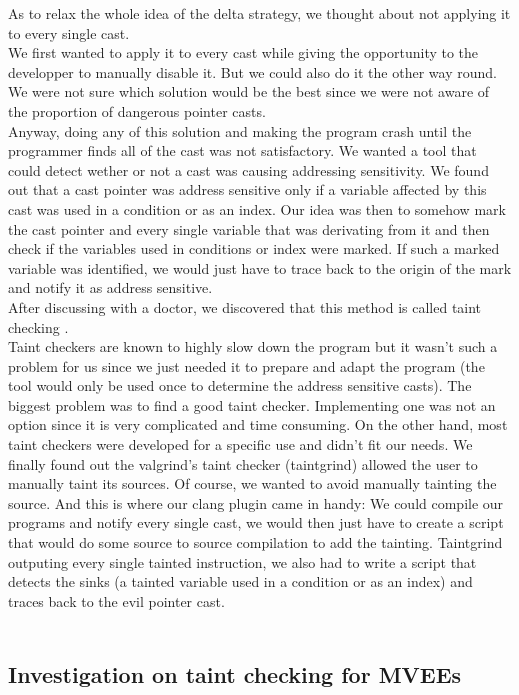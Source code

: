 \documentclass[english]{enstaPRE}
\begin{document}
As to relax the whole idea of the delta strategy, we thought about not applying it to every single cast. \\
We first wanted to apply it to every cast while giving the opportunity to the developper to manually disable it. But we could also do
it the other way round. We were not sure which solution would be the best since we were not aware of the proportion of dangerous pointer casts. \\ Anyway, doing any of this solution and making the program crash until the programmer finds all
of the cast was not satisfactory.
We wanted a tool that could detect wether or not a cast was causing addressing sensitivity. We found out that a cast pointer was
address sensitive only if a variable affected by this cast was used in a condition or as an index.
Our idea was then to somehow mark the cast pointer and every single variable that was derivating from it and then check if the variables
used in conditions or index were marked. If such a marked variable was identified, we would just have to trace back to the origin of
the mark and notify it as address sensitive. \\ 
After discussing with a doctor, we discovered that this method is called taint checking \cite{taint}. \\
Taint checkers are known to highly slow down the program but it wasn't such a problem for us since we just needed it to prepare and 
adapt the program (the tool would only be used once to determine the address sensitive casts). The biggest problem was to find a good 
taint checker. Implementing one was not an option since it is very complicated and time consuming. On the other hand, most taint 
checkers were developed for a specific use and didn't fit our needs. We finally found out the valgrind's taint checker (taintgrind)
allowed the user to manually taint its sources. Of course, we wanted to avoid manually tainting the source. And this is where our
clang plugin came in handy: We could compile our programs and notify every single cast, we would then just have to create a script 
that would do some source to source compilation to add the tainting. Taintgrind outputing every single tainted instruction, we also had to write a script
that detects the sinks (a tainted variable used
in a condition or as an index) and traces back to the evil pointer cast. \\ \\

\subsection{Investigation on taint checking for MVEEs}
\end{document}
